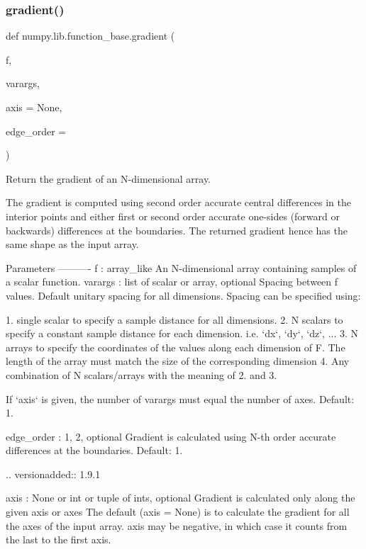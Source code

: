 \subsubsection{\texorpdfstring{gradient()}{gradient()}}
{\footnotesize\ttfamily def numpy.\+lib.\+function\+\_\+base.\+gradient (\begin{DoxyParamCaption}\item[{}]{f,  }\item[{}]{varargs,  }\item[{}]{axis = {\ttfamily None},  }\item[{}]{edge\+\_\+order = {} }\end{DoxyParamCaption})}

\begin{DoxyVerb}Return the gradient of an N-dimensional array.

The gradient is computed using second order accurate central differences
in the interior points and either first or second order accurate one-sides
(forward or backwards) differences at the boundaries.
The returned gradient hence has the same shape as the input array.

Parameters
----------
f : array_like
    An N-dimensional array containing samples of a scalar function.
varargs : list of scalar or array, optional
    Spacing between f values. Default unitary spacing for all dimensions.
    Spacing can be specified using:

    1. single scalar to specify a sample distance for all dimensions.
    2. N scalars to specify a constant sample distance for each dimension.
       i.e. `dx`, `dy`, `dz`, ...
    3. N arrays to specify the coordinates of the values along each
       dimension of F. The length of the array must match the size of
       the corresponding dimension
    4. Any combination of N scalars/arrays with the meaning of 2. and 3.

    If `axis` is given, the number of varargs must equal the number of axes.
    Default: 1.

edge_order : {1, 2}, optional
    Gradient is calculated using N-th order accurate differences
    at the boundaries. Default: 1.

    .. versionadded:: 1.9.1

axis : None or int or tuple of ints, optional
    Gradient is calculated only along the given axis or axes
    The default (axis = None) is to calculate the gradient for all the axes
    of the input array. axis may be negative, in which case it counts from
    the last to the first axis.


\end{DoxyVerb}
